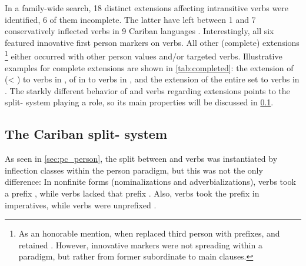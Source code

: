 In a family-wide search, 18 distinct extensions affecting intransitive verbs were identified, 6 of them incomplete.
The latter have left between 1 and 7 conservatively inflected verbs in 9 Cariban languages .
Interestingly, all six featured innovative first person markers on  verbs.
All other (complete) extensions%
\footnote{As an honorable mention, when \ikpeng replaced third person \setone with \settwo prefixes,   and   retained  \parencite[12]{matter2019arara}.
	However, innovative markers were not spreading within a paradigm, but rather from former subordinate to main clauses.} either occurred with other person values and/or targeted  verbs.
Illustrative examples for complete extensions are shown in \cref{tab:completed}: the extension of   (< ) to  verbs in \apalai {}, of   in to  verbs in \panare {}, and the extension of the entire  set to  verbs in \waimiri {}. %
The starkly different behavior of  and  verbs regarding extensions points to the split- system playing a role, so its main properties will be discussed in \cref{sec:split}.



\subsection{The Cariban split- system}
\label{sec:split}
As seen in \cref{sec:pc_person}, the split between  and  verbs was instantiated by inflection classes within the \PC \setone person paradigm, but this was not the only difference:
In nonfinite forms (nominalizations and adverbializations),  verbs took a prefix , while  verbs lacked that prefix \parencites[89, 141--142]{gildea1998}[208]{meira2000split}.
Also,  verbs took the  prefix  in imperatives, while  verbs were unprefixed \parencites[89]{gildea1998}[208]{meira2000split}.

